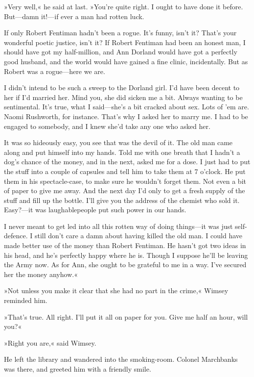 »Very well,« he said at last. »You're quite right. I ought to have done it before. But—damn it!—if ever a man had rotten luck\textellipsis .

If only Robert Fentiman hadn't been a rogue. It's funny, isn't it? That's your wonderful poetic justice, isn't it? If Robert Fentiman had been an honest man, I should have got my half-million, and Ann Dorland would have got a perfectly good husband, and the world would have gained a fine clinic, incidentally. But as Robert was a rogue—here we are\textellipsis .

I didn't intend to be such a sweep to the Dorland girl. I'd have been decent to her if I'd married her. Mind you, she did sicken me a bit. Always wanting to be sentimental. It's true, what I said—she's a bit cracked about sex. Lots of 'em are. Naomi Rushworth, for instance. That's why I asked her to marry me. I had to be engaged to somebody, and I knew she'd take any one who asked her\textellipsis .

It was so hideously easy, you see \textellipsis that was the devil of it. The old man came along and put himself into my hands. Told me with one breath that I hadn't a dog's chance of the money, and in the next, asked me for a dose. I just had to put the stuff into a couple of capsules and tell him to take them at 7 o'clock. He put them in his spectacle-case, to make sure he wouldn't forget them. Not even a bit of paper to give me away. And the next day I'd only to get a fresh supply of the stuff and fill up the bottle. I'll give you the address of the chemist who sold it. Easy?—it was laughable\textellipsis people put such power in our hands\textellipsis .

I never meant to get led into all this rotten way of doing things—it was just self-defence. I still don't care a damn about having killed the old man. I could have made better use of the money than Robert Fentiman. He hasn't got two ideas in his head, and he's perfectly happy where he is. Though I suppose he'll be leaving the Army now\textellipsis . As for Ann, she ought to be grateful to me in a way. I've secured her the money anyhow.«

»Not unless you make it clear that she had no part in the crime,« Wimsey reminded him.

»That's true. All right. I'll put it all on paper for you. Give me half an hour, will you?«

»Right you are,« said Wimsey.

He left the library and wandered into the smoking-room. Colonel Marchbanks was there, and greeted him with a friendly smile.

